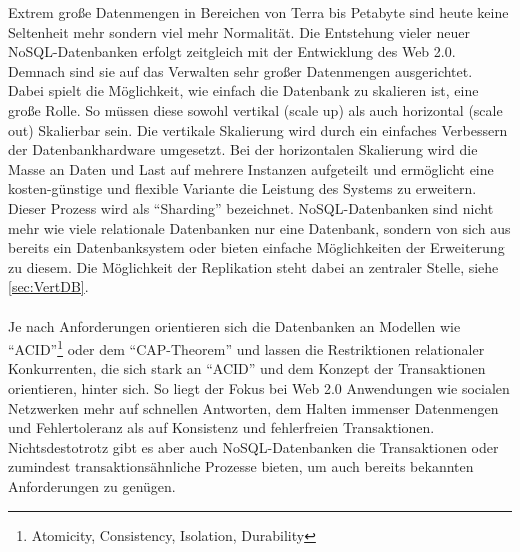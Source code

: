 \documentclass[a4paper,11pt,oneside,%
headsepline,												%
footsepline,												%
bibtotocnumbered									%
]{scrreprt}
\begin{document}
Extrem große Datenmengen in Bereichen von Terra bis Petabyte sind heute keine Seltenheit mehr sondern viel mehr Normalität. Die Entstehung vieler neuer NoSQL-Datenbanken erfolgt zeitgleich mit der Entwicklung des Web 2.0. Demnach sind sie auf das Verwalten sehr großer Datenmengen ausgerichtet.
Dabei spielt die Möglichkeit, wie einfach die Datenbank zu skalieren ist, eine große Rolle. So müssen diese sowohl vertikal (scale up) als auch horizontal (scale out) Skalierbar sein. Die vertikale Skalierung wird durch ein einfaches Verbessern der Datenbankhardware umgesetzt. Bei der horizontalen Skalierung wird die Masse an Daten und Last auf mehrere Instanzen aufgeteilt und ermöglicht eine kosten-günstige und flexible Variante die Leistung des Systems zu erweitern. Dieser Prozess wird als \enquote{Sharding} bezeichnet.
NoSQL-Datenbanken sind nicht mehr wie viele relationale Datenbanken nur eine Datenbank, sondern von sich aus bereits ein Datenbanksystem oder bieten einfache Möglichkeiten der Erweiterung zu diesem. Die Möglichkeit der Replikation steht dabei an zentraler Stelle, siehe \autoref{sec:VertDB}.\\\\
Je nach Anforderungen orientieren sich die Datenbanken an Modellen wie \enquote{ACID}\footnote{Atomicity, Consistency, Isolation, Durability} oder dem \enquote{CAP-Theorem} und lassen die Restriktionen relationaler Konkurrenten, die sich stark an \enquote{ACID} und dem Konzept der Transaktionen orientieren, hinter sich. So liegt der Fokus bei Web 2.0 Anwendungen wie socialen Netzwerken mehr auf schnellen Antworten, dem Halten immenser Datenmengen und Fehlertoleranz als auf Konsistenz und fehlerfreien Transaktionen.
Nichtsdestotrotz gibt es aber auch NoSQL-Datenbanken die Transaktionen oder  zumindest transaktionsähnliche Prozesse bieten, um auch bereits bekannten Anforderungen zu genügen.
\end{document}
